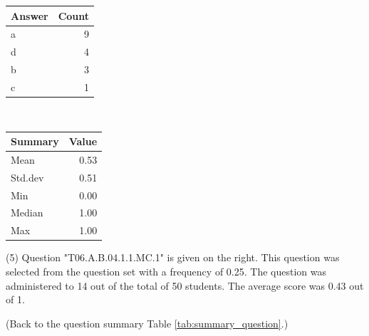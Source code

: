 \documentclass[12pt,english,nohyper]{tufte-handout}\usepackage[]{graphicx}\usepackage[]{color}
\begin{document}
\begin{center}%
\begin{tabular}{lr}
  \hline
Answer & Count \\ 
  \hline
a &   9 \\ 
  d &   4 \\ 
  b &   3 \\ 
  c &   1 \\ 
   \hline
\end{tabular}
~~~~~~~~%
\begin{tabular}{lr}
  \hline
Summary & Value \\ 
  \hline
Mean & 0.53 \\ 
  Std.dev & 0.51 \\ 
  Min & 0.00 \\ 
  Median & 1.00 \\ 
  Max & 1.00 \\ 
   \hline
\end{tabular}
\end{center}\newpage{} (5) Question "T06.A.B.04.1.1.MC.1" is given on the right. This question was selected from the question set with a frequency of 0.25. The question was administered to 14 out of the total of 50 students. The average score was 0.43 out of 1.

 (Back to the question summary Table \ref{tab:summary_question}.)
\end{document}
